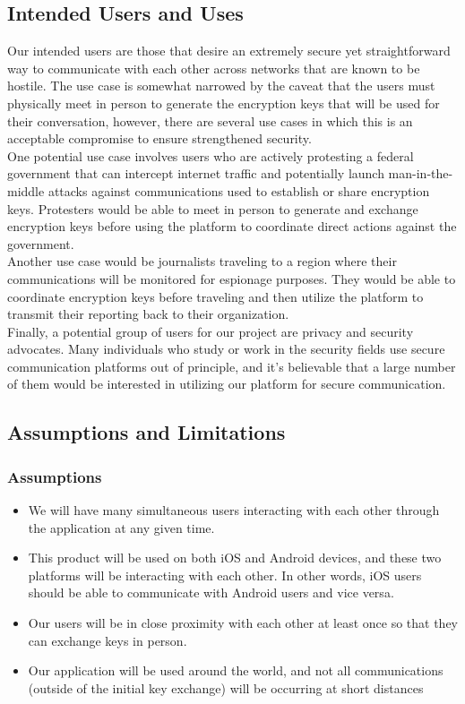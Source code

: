 \documentclass[11pt]{article}
\begin{document}
\subsection{Intended Users and Uses}
Our intended users are those that desire an extremely secure yet straightforward way to communicate with each other across networks that are known to be hostile. The use case is somewhat narrowed by the caveat that the users must physically meet in person to generate the encryption keys that will be used for their conversation, however, there are several use cases in which this is an acceptable compromise to ensure strengthened security.\\

One potential use case involves users who are actively protesting a federal government that can intercept internet traffic and potentially launch man-in-the-middle attacks against communications used to establish or share encryption keys.  Protesters would be able to meet in person to generate and exchange encryption keys before using the platform to coordinate direct actions against the government.\\

Another use case would be journalists traveling to a region where their communications will be monitored for espionage purposes. They would be able to coordinate encryption keys before traveling and then utilize the platform to transmit their reporting back to their organization.\\

Finally, a potential group of users for our project are privacy and security advocates. Many individuals who study or work in the security fields use secure communication platforms out of principle, and it’s believable that a large number of them would be interested in utilizing our platform for secure communication.


\subsection{Assumptions and Limitations}
\subsubsection*{Assumptions}
\begin{itemize}
	\item{We will have many simultaneous users interacting with each other through the 	application at any given time.}
	\item{This product will be used on both iOS and Android devices, and these two platforms will be interacting with each other. In other words, iOS users should be able to communicate with Android users and vice versa.}
	\item{Our users will be in close proximity with each other at least once so that they can exchange keys in person.}
	\item{Our application will be used around the world, and not all communications (outside of the initial key exchange) will be occurring at short distances}
\end{itemize}
\end{document}
